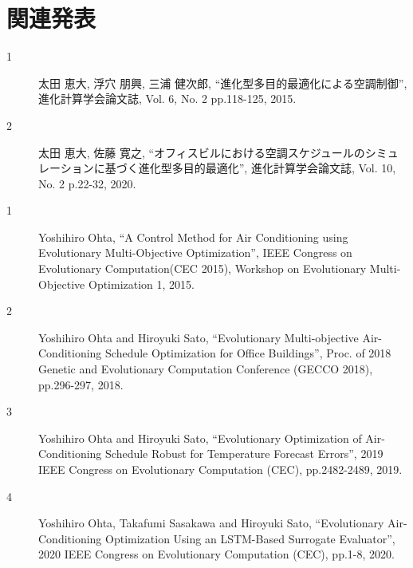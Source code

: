 \chapter*{関連発表}
\pagestyle{empty}

{\Large {}}
\begin{description}
      \item[1] 太田 恵大, 浮穴 朋興, 三浦 健次郎,
            ``進化型多目的最適化による空調制御'',
            進化計算学会論文誌, Vol. 6, No. 2 pp.118-125, 2015.

      \item[2] 太田 恵大, 佐藤 寛之,
            ``オフィスビルにおける空調スケジュールのシミュレーションに基づく進化型多目的最適化'',
            進化計算学会論文誌, Vol. 10, No. 2 p.22-32, 2020.
\end{description}

{\Large {}}
\begin{description}
      \item[1] Yoshihiro Ohta,
            ``A Control Method for Air Conditioning using Evolutionary Multi-Objective Optimization'',
            IEEE Congress on Evolutionary Computation(CEC 2015), Workshop on Evolutionary Multi-Objective Optimization 1, 2015.

      \item[2] Yoshihiro Ohta and Hiroyuki Sato,
            ``Evolutionary Multi-objective Air-Conditioning Schedule Optimization for Office Buildings'',
            Proc. of 2018 Genetic and Evolutionary Computation Conference (GECCO 2018), pp.296-297, 2018.

      \item[3] Yoshihiro Ohta and Hiroyuki Sato,
            ``Evolutionary Optimization of Air-Conditioning Schedule Robust for Temperature Forecast Errors'',
            2019 IEEE Congress on Evolutionary Computation (CEC), pp.2482-2489, 2019.

      \item[4] Yoshihiro Ohta, Takafumi Sasakawa and Hiroyuki Sato,
            ``Evolutionary Air-Conditioning Optimization Using an LSTM-Based Surrogate Evaluator'', 2020 IEEE Congress on Evolutionary Computation (CEC), pp.1-8, 2020.
\end{description}

